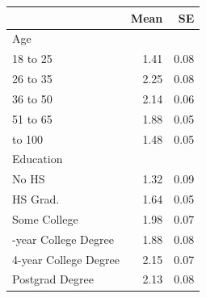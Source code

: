 
\begin{tabular}{lrr}
\toprule
 & Mean & SE\\
\midrule
Age &  & \\
18 to 25 & 1.41 & 0.08\\
26 to 35 & 2.25 & 0.08\\
36 to 50 & 2.14 & 0.06\\
51 to 65 & 1.88 & 0.05\\
\addlinespace
66 to 100 & 1.48 & 0.05\\
Education &  & \\
No HS & 1.32 & 0.09\\
HS Grad. & 1.64 & 0.05\\
Some College & 1.98 & 0.07\\
\addlinespace
2-year College Degree & 1.88 & 0.08\\
4-year College Degree & 2.15 & 0.07\\
Postgrad Degree & 2.13 & 0.08\\
\bottomrule
\end{tabular}
